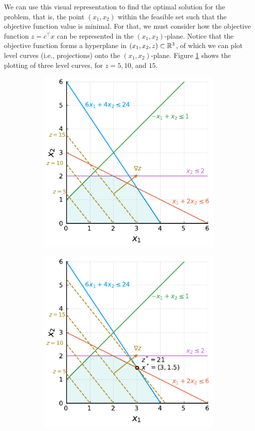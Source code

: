 We can use this visual representation to find the optimal solution for the problem, that is, the point $(x_1,x_2)$ within the feasible set such that the objective function value is minimal. For that, we must consider how the objective function $z = c^\top x$ can be represented in the $(x_1, x_2)$-plane. Notice that the objective function forms a hyperplane in $(x_1, x_2, z) \subset \mathbb{R}^3$, of which we can plot level curves (i.e., projections) onto the $(x_1, x_2)$-plane. Figure \ref{p1c1:fig:level_curves_a} shows the plotting of three level curves, for $z= 5, 10$, and $15$. 
%
\begin{figure}
	\begin{subfigure}{0.45\textwidth}
		\includegraphics[scale=0.99]{part_1/chapter_1/figures/figure3_c6.pdf}  
		\caption{} \label{p1c1:fig:level_curves_a}	
	\end{subfigure}
	\begin{subfigure}{0.45\textwidth}
		\includegraphics[scale=0.99]{part_1/chapter_1/figures/figure3_complete.pdf}

\end{subfigure}
\end{figure}
